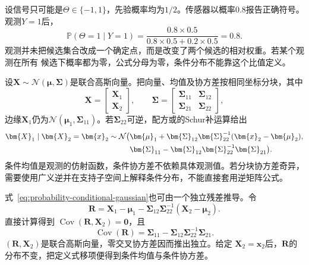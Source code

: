 \begin{example}[有限候选经过带噪观测更新]
\label{ex:probability-finite-candidate-bayes}
设信号只可能是\(\Theta\in\{-1,1\}\)，先验概率均为\(1/2\)。传感器以概率\(0.8\)报告正确符号。观测\(Y=1\)后，
\[ \mathbb{P}(\Theta=1\mid Y=1)
  =\frac{0.8\times0.5}{0.8\times0.5+0.2\times0.5}=0.8. \]
观测并未把候选集合改成一个确定点，而是改变了两个候选的相对权重。若某个观测在所有
候选下概率都为零，公式分母为零，条件分布不能靠这个比值定义。
\end{example}
设\(\bm X\sim\mathcal N(\bm\mu,\bm\Sigma)\)是联合高斯向量。把向量、均值及协方差按相同坐标分块，其中
\[
  \bm{X}=
  \begin{bmatrix}\bm{X}_1\\\bm{X}_2\end{bmatrix},
  \qquad
  \bm{\Sigma}=
  \begin{bmatrix}
    \bm{\Sigma}_{11}&\bm{\Sigma}_{12}\\
    \bm{\Sigma}_{21}&\bm{\Sigma}_{22}
  \end{bmatrix},
\]
边缘\(\bm{X}_1\)仍为\(\mathcal{N}(\bm{\mu}_1,\bm{\Sigma}_{11})\)。若\(\bm{\Sigma}_{22}\)可逆，配方或的Schur补运算给出
\begin{align}
  \bm{X}_1\mid\bm{X}_2=\bm{x}_2
  \sim\mathcal{N}\bigl(
  &\bm{\mu}_1+
  \bm{\Sigma}_{12}\bm{\Sigma}_{22}^{-1}
  (\bm{x}_2-\bm{\mu}_2),\notag\\
  &\bm{\Sigma}_{11}
  -\bm{\Sigma}_{12}\bm{\Sigma}_{22}^{-1}
  \bm{\Sigma}_{21}
  \bigr).
  \label{eq:probability-conditional-gaussian}
\end{align}
条件均值是观测的仿射函数，条件协方差不依赖具体观测值。若分块协方差奇异，需要使用广义逆并在支持子空间上解释条件分布，不能直接套用逆矩阵公式。

式~\eqref{eq:probability-conditional-gaussian}也可由一个独立残差推导。令
\[
  \bm{R}
  =\bm{X}_1-\bm{\mu}_1
   -\bm{\Sigma}_{12}\bm{\Sigma}_{22}^{-1}
    (\bm{X}_2-\bm{\mu}_2).
\]
直接计算得到
\(\operatorname{Cov}(\bm{R},\bm{X}_2)=\bm{0}\)，且
\[
  \operatorname{Cov}(\bm{R})
  =\bm{\Sigma}_{11}
   -\bm{\Sigma}_{12}\bm{\Sigma}_{22}^{-1}\bm{\Sigma}_{21}.
\]
\((\bm{R},\bm{X}_2)\)是联合高斯向量，零交叉协方差因而推出独立。给定
\(\bm{X}_2=\bm{x}_2\)后，\(\bm{R}\)的分布不变，把定义式移项便得到条件均值与条件协方差。


